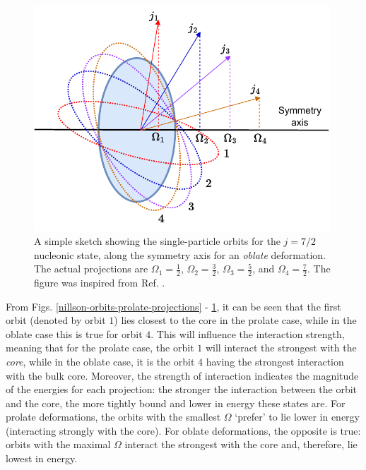 \begin{figure}
    \centering
    \includegraphics[width=0.99\textwidth]{Chapters/Figures/nillson_SP_orbits_2.pdf}
    \caption{A simple sketch showing the single-particle orbits for the $j=7/2$ nucleonic state, along the symmetry axis for an \emph{oblate} deformation. The actual projections are $\Omega_1=\frac{1}{2}$, $\Omega_2=\frac{3}{2}$, $\Omega_3=\frac{5}{2}$, and $\Omega_4=\frac{7}{2}$. The figure was inspired from Ref. \cite{krane1991introductory}.}
    \label{nillson-orbits-oblate-projections}
\end{figure}

From Figs. \ref{nillson-orbits-prolate-projections} - \ref{nillson-orbits-oblate-projections}, it can be seen that the first orbit (denoted by orbit $1$) lies closest to the core in the prolate case, while in the oblate case this is true for orbit $4$. This will influence the interaction strength, meaning that for the prolate case, the orbit $1$ will interact the strongest with the \emph{core}, while in the oblate case, it is the orbit $4$ having the strongest interaction with the bulk core. Moreover, the strength of interaction indicates the magnitude of the energies for each projection: the stronger the interaction between the orbit and the core, the more tightly bound and lower in energy these states are. For prolate deformations, the orbits with the smallest $\Omega$ `prefer' to lie lower in energy (interacting strongly with the core). For oblate deformations, the opposite is true: orbits with the maximal $\Omega$ interact the strongest with the core and, therefore, lie lowest in energy.

